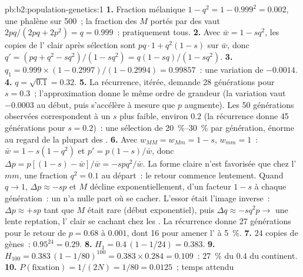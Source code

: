 \begin{solution}{pb:b2:population-genetics:1}
\textbf{1.} Fraction mélanique $1 - q^{2} = 1 - 0.999^{2} = 0.002$,
une phalène sur 500~; la fraction des  $M$ portés par des
 vaut
$2pq/(2pq + 2p^{2}) = q = 0.999$~: pratiquement tous.
\textbf{2.} Avec $\bar w = 1 - sq^{2}$, les copies de l' clair
après sélection sont $pq\cdot 1 + q^{2}(1 - s)$ sur $\bar w$, donc $q'
= (pq + q^{2} - sq^{2})/(1 - sq^{2}) = q(1 - sq)/(1 - sq^{2})$.
\textbf{3.} $q_1 = 0.999\times(1 - 0.2997)/(1 - 0.2994) = 0.99857$~:
une variation de $-0.0014$.
\textbf{4.} $q = \sqrt{0.1} = 0.32$.
\textbf{5.} La récurrence, itérée, demande 28 générations pour $s =
0.3$~; l'approximation donne le même ordre de grandeur (la variation vaut
$-0.0003$ au début, puis s'accélère à mesure que $p$ augmente). Les 50
générations observées correspondent à un $s$ plus faible, environ $0.2$ (la récurrence
donne 45 générations pour $s = 0.2$)~: une sélection de \qtyrange{20}{30}{\%}
par génération, énorme au regard de la plupart des .
\textbf{6.} Avec $w_{MM} = w_{Mm} = 1 - s$, $w_{mm} = 1$~: $\bar w = 1
- s(1 - q^{2})$ et $p' = p(1 - s)/\bar w$, donc $\Delta p = p[(1 - s) -
\bar w]/\bar w = -spq^{2}/\bar w$. La forme claire n'est favorisée que
chez l' $mm$, une fraction $q^{2} = 0.1$ au départ~: le
retour commence lentement. Quand $q \to 1$, $\Delta p \approx -sp$ et $M$
décline exponentiellement, d'un facteur $1 - s$ à chaque génération~: un
  n'a nulle part où se cacher. L'essor était l'image
inverse~:
$\Delta p \approx +sp$ tant que $M$ était rare (début exponentiel), puis
$\Delta q \approx -sq^{2}p \to$ une lente reptation, l' clair se
cachant chez les . La récurrence donne 27 générations pour
le retour de $p = 0.68$ à $0.001$, dont 16 pour amener l' à \qty{5}{\%}.
\textbf{7.} $24$ copies de gènes~: $0.95^{24} = 0.29$.
\textbf{8.} $H_1 = 0.4\,(1 - 1/24) = 0.383$.
\textbf{9.} $H_{100} = 0.383\,(1 - 1/80)^{100} = 0.383\times 0.284 =
0.109$~: \qty{27}{\%} du $0.4$ du continent.
\textbf{10.} $P(\text{fixation}) = 1/(2N) = 1/80 = 0.0125$~; temps attendu

\end{solution}
